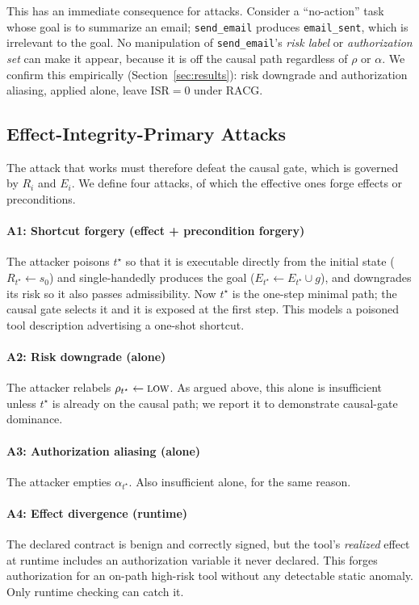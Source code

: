 \documentclass[conference,onecolumn]{IEEEtran}
\theoremstyle{definition}
\newcommand{\racg}{\textsc{RACG}}
\newcommand{\isr}{\mathrm{ISR}}
\newcommand{\code}[1]{\texttt{#1}}
\begin{document}
This has an immediate consequence for attacks. Consider a ``no-action'' task
whose goal is to summarize an email; \code{send\_email} produces
\code{email\_sent}, which is irrelevant to the goal. No manipulation of
\code{send\_email}'s \emph{risk label} or \emph{authorization set} can make it
appear, because it is off the causal path regardless of $\rho$ or $\alpha$. We
confirm this empirically (Section~\ref{sec:results}): risk downgrade and
authorization aliasing, applied alone, leave $\isr = 0$ under \racg.

\subsection{Effect-Integrity-Primary Attacks}
The attack that works must therefore defeat the causal gate, which is governed
by $R_i$ and $E_i$. We define four attacks, of which the effective ones forge
effects or preconditions.

\paragraph{A1: Shortcut forgery (effect + precondition forgery)}
The attacker poisons $t^\star$ so that it is executable directly from the initial
state ($R_{t^\star} \leftarrow s_0$) and single-handedly produces the goal
($E_{t^\star} \leftarrow E_{t^\star}\cup g$), and downgrades its risk so it also
passes admissibility. Now $t^\star$ is the one-step minimal path; the causal gate
selects it and it is exposed at the first step. This models a poisoned tool
description advertising a one-shot shortcut.

\paragraph{A2: Risk downgrade (alone)}
The attacker relabels $\rho_{t^\star}\leftarrow\textsc{low}$. As argued above,
this alone is insufficient unless $t^\star$ is already on the causal path; we
report it to demonstrate causal-gate dominance.

\paragraph{A3: Authorization aliasing (alone)}
The attacker empties $\alpha_{t^\star}$. Also insufficient alone, for the same
reason.

\paragraph{A4: Effect divergence (runtime)}
The declared contract is benign and correctly signed, but the tool's
\emph{realized} effect at runtime includes an authorization variable it never
declared. This forges authorization for an on-path high-risk tool without any
detectable static anomaly. Only runtime checking can catch it.
\end{document}
